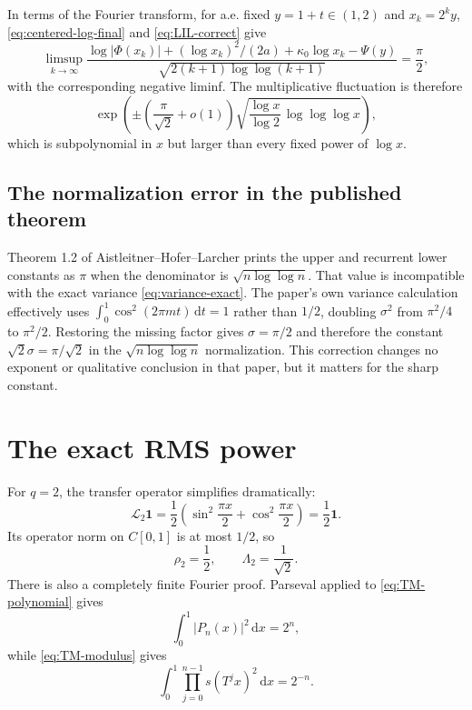 \documentclass[11pt,oneside]{article}
\theoremstyle{definition}
\theoremstyle{remark}
\newcommand{\dd}{\,\mathrm d}
\newcommand{\abs}[1]{\left|#1\right|}
\begin{document}
In terms of the Fourier transform, for a.e. fixed $y=1+t\in(1,2)$ and
$x_k=2^ky$, \eqref{eq:centered-log-final} and \eqref{eq:LIL-correct} give
\begin{equation}
 \limsup_{k\to\infty}
 \frac{\log|\Phi(x_k)|+(\log x_k)^2/(2a)+\kappa_0\log x_k-\Psi(y)}
 {\sqrt{2(k+1)\log\log(k+1)}}=\frac\pi2,
 \label{eq:LIL-Phi}
\end{equation}
with the corresponding negative liminf.  The multiplicative fluctuation is therefore
\[
 \exp\!\left(\pm\left(\frac\pi{\sqrt2}+o(1)\right)
 \sqrt{\frac{\log x}{\log2}\,\log\log\log x}\right),
\]
which is subpolynomial in $x$ but larger than every fixed power of $\log x$.

\subsection{The normalization error in the published theorem}
\label{subsec:published-error}

Theorem 1.2 of Aistleitner--Hofer--Larcher \cite{ahl2017} prints the upper and recurrent
lower constants as $\pi$ when the denominator is $\sqrt{n\log\log n}$.  That value is
incompatible with the exact variance \eqref{eq:variance-exact}.  The paper's own variance
calculation effectively uses
$\int_0^1\cos^2(2\pi mt)\dd t=1$ rather than $1/2$, doubling $\sigma^2$ from
$\pi^2/4$ to $\pi^2/2$.  Restoring the missing factor gives
$\sigma=\pi/2$ and therefore the constant $\sqrt2\sigma=\pi/\sqrt2$ in the
$\sqrt{n\log\log n}$ normalization.  This correction changes no exponent or qualitative
conclusion in that paper, but it matters for the sharp constant.

\section{The exact RMS power}
\label{sec:RMS}

For $q=2$, the transfer operator simplifies dramatically:
\begin{equation}
 \mathcal L_2\mathbf1
 =\frac12\left(\sin^2\frac{\pi x}{2}+\cos^2\frac{\pi x}{2}\right)
 =\frac12\mathbf1.
 \label{eq:L2-one}
\end{equation}
Its operator norm on $C[0,1]$ is at most $1/2$, so
\begin{equation}
 \rho_2=\frac12,
 \qquad
 \Lambda_2=\frac1{\sqrt2}.
 \label{eq:rho2}
\end{equation}
There is also a completely finite Fourier proof.  Parseval applied to
\eqref{eq:TM-polynomial} gives
\[
 \int_0^1\abs{P_n(x)}^2\dd x=2^n,
\]
while \eqref{eq:TM-modulus} gives
\begin{equation}
 \int_0^1\prod_{j=0}^{n-1}s(T^jx)^2\dd x=2^{-n}.
 \label{eq:exact-L2-product}
\end{equation}
\end{document}
